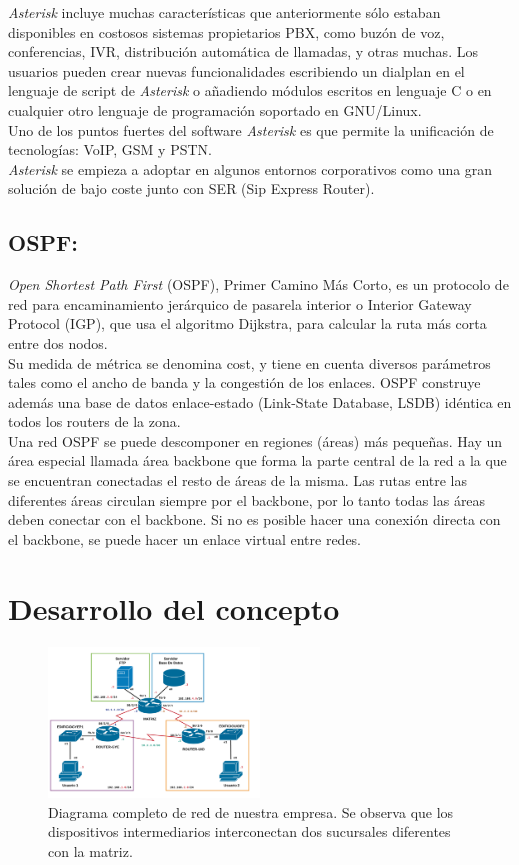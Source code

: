 \documentclass[conference]{IEEEtran}
\begin{document}
\textit{Asterisk} incluye muchas características que anteriormente sólo estaban disponibles en costosos sistemas propietarios PBX, como buzón de voz, conferencias, IVR, distribución automática de llamadas, y otras muchas. Los usuarios pueden crear nuevas funcionalidades escribiendo un dialplan en el lenguaje de script de \textit{Asterisk} o añadiendo módulos escritos en lenguaje C o en cualquier otro lenguaje de programación soportado en GNU/Linux.\\
Uno de los puntos fuertes del software \textit{Asterisk} es que permite la unificación de tecnologías: VoIP, GSM y PSTN.\\
\textit{Asterisk} se empieza a adoptar en algunos entornos corporativos como una gran solución de bajo coste junto con SER (Sip Express Router).


\subsection{\textbf{ OSPF:}}
\textit{Open Shortest Path First} (OSPF), Primer Camino Más Corto, es un protocolo de red para encaminamiento jerárquico de pasarela interior o Interior Gateway Protocol (IGP), que usa el algoritmo Dijkstra, para calcular la ruta más corta entre dos nodos.\\
Su medida de métrica se denomina cost, y tiene en cuenta diversos parámetros tales como el ancho de banda y la congestión de los enlaces. OSPF construye además una base de datos enlace-estado (Link-State Database, LSDB) idéntica en todos los routers de la zona.\\
Una red OSPF se puede descomponer en regiones (áreas) más pequeñas. Hay un área especial llamada área backbone que forma la parte central de la red a la que se encuentran conectadas el resto de áreas de la misma. Las rutas entre las diferentes áreas circulan siempre por el backbone, por lo tanto todas las áreas deben conectar con el backbone. Si no es posible hacer una conexión directa con el backbone, se puede hacer un enlace virtual entre redes.

\section{Desarrollo del concepto}\label{sec:ddc}
\begin{figure}[h]
	\centerline{\includegraphics[width=0.50\textwidth]{img/desa01.png}}
	\caption{Diagrama completo de red de nuestra empresa. Se observa que los dispositivos intermediarios interconectan dos sucursales diferentes con la matriz.}
	\label{fig:ddc01}
\end{figure}
\end{document}
